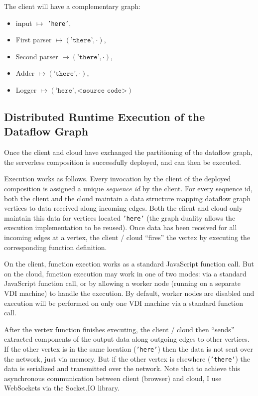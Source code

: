 \documentclass[10pt,sigplan,screen,nonacm]{acmart}
\begin{document}
The client will have a complementary graph:
\begin{itemize}
	\item input $\mapsto$ \texttt{'here'},
	\item First parser $\mapsto (\texttt{'there'}, \cdot)$,
	\item Second parser $\mapsto (\texttt{'there'}, \cdot)$,
	\item Adder $\mapsto (\texttt{'there'}, \cdot)$,
	\item Logger $\mapsto (\texttt{'here'}, \texttt{<source code>})$
\end{itemize}


\subsection{Distributed Runtime Execution of the Dataflow Graph}
\label{section:dag-execution}

Once the client and cloud have exchanged the partitioning of the dataflow graph,
the serverless composition is successfully deployed, and can then be
executed.

Execution works as follows. Every invocation by the client of the deployed 
composition is assigned a unique \emph{sequence id} by the client. For every
sequence id, both the client and the cloud maintain a data structure
mapping dataflow graph vertices to data received along incoming edges.
Both the client and cloud only maintain this data for vertices located
\texttt{'here'} (the graph duality allows the execution implementation to be reused).
Once data has been received for all incoming edges at a vertex, the
client / cloud ``fires'' the vertex by executing the corresponding function definition.

On the client, function exection works as a standard JavaScript function call.
But on the cloud, function execution may work in one of two modes:
via a standard JavaScript function call, or by allowing a worker node
(running on a separate VDI machine) to handle the execution. By default,
worker nodes are disabled and execution will be performed on only one
VDI machine via a standard function call.

After the vertex function finishes executing, the client / cloud
then ``sends'' extracted components of the output data along outgoing edges to
other vertices. If the other vertex is in the same location (\texttt{'here'})
then the data is not sent over the network, just via memory. But if the
other vertex is elsewhere (\texttt{'there'}) the data is serialized
and transmitted over the network. Note that to achieve this asynchronous
communication between client (browser) and cloud, I use WebSockets via
the Socket.IO library.
\end{document}
